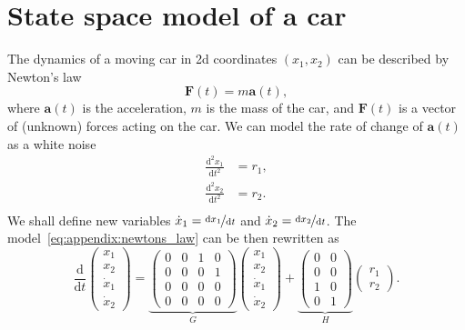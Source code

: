 \section{State space model of a car}\label{appendix:proofs:car_dynamics}

The dynamics of a moving car in 2d coordinates $(x_1, x_2)$ can be described by Newton's law
  \begin{equation}
    \label{eq:appendix:newtons_law} \bm{F}(t) = m \bm{a}(t),
  \end{equation}
  where
  $\bm{a}(t)$ is the acceleration, $m$ is the mass of the car, and $\bm{F}(t)$ is a vector of
  (unknown) forces acting on the car.
We can model the rate of change of $\bm{a}(t)$ as a white noise \begin{equation} \begin{split}
  \frac{\mathrm{d}^2 x_1}{\mathrm{d} t^2} &= r_1, \\ \frac{\mathrm{d}^2 x_2}{\mathrm{d} t^2} &=
  r_2.
\\
\end{split}
\end{equation}
We shall define new variables $\dot{x}_1 = \nicefrac{\mathrm{d} x_1}{\mathrm{d} t}$ and
  $\dot{x}_2 = \nicefrac{\mathrm{d} x_2}{\mathrm{d} t}$.
The model~\eqref{eq:appendix:newtons_law} can be then rewritten as \begin{equation}
  \frac{\mathrm{d}}{\mathrm{d} t}
  \begin{pmatrix}
    x_1 \\ x_2 \\ \dot{x}_1 \\ \dot{x}_2
  \end{pmatrix}
  = \underbrace{
    \begin{pmatrix}
      0 & 0 & 1 & 0 \\ 0 & 0 & 0 & 1 \\ 0 & 0 & 0 & 0
      \\ 0 & 0 & 0 & 0
    \end{pmatrix}
  }_{G}
  \begin{pmatrix}
    x_1 \\ x_2 \\ \dot{x}_1 \\ \dot{x}_2
  \end{pmatrix}
  + \underbrace{
    \begin{pmatrix}
      0 & 0 \\ 0 & 0 \\ 1 & 0 \\ 0 & 1
    \end{pmatrix}
  }_{H}
  \begin{pmatrix}
    r_1 \\ r_2
  \end{pmatrix}
  .
\end{equation}

